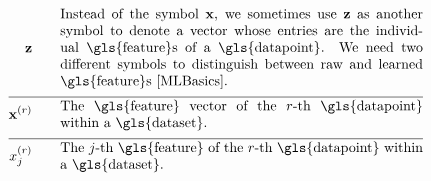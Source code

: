 \begin{align}
	\rawfeaturevec \quad\quad &\parbox{.75\textwidth}{Instead of the symbol $\featurevec$, we 
		sometimes use $\rawfeaturevec$ as another symbol to denote a vector whose entries 
		are the individual \gls{feature}s of a \gls{datapoint}. We need two 
		different symbols to distinguish between raw and learned \gls{feature}s \cite[Ch. 9]{MLBasics}.}\nonumber \\[2mm] \hline \nonumber\\[-5mm]
	\featurevec^{(\sampleidx)} \quad\quad &\parbox{.75\textwidth}{The \gls{feature} vector of the $\sampleidx$-th \gls{datapoint} within a \gls{dataset}. } \nonumber \\[2mm] \hline \nonumber\\[-5mm]
	\feature_{\featureidx}^{(\sampleidx)}\quad\quad &\parbox{.75\textwidth}{The $\featureidx$-th \gls{feature} of the $\sampleidx$-th 
		\gls{datapoint} within a \gls{dataset}.} \nonumber
\end{align}        


